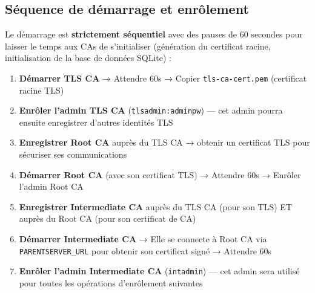 \documentclass[12pt,a4paper,twoside]{report}
\begin{document}
\subsection{Séquence de démarrage et enrôlement}

Le démarrage est \textbf{strictement séquentiel} avec des pauses de 60 secondes pour laisser le temps aux CAs de s'initialiser (génération du certificat racine, initialisation de la base de données SQLite) :

\begin{enumerate}
    \item \textbf{Démarrer TLS CA} → Attendre 60s → Copier \texttt{tls-ca-cert.pem} (certificat racine TLS)
    \item \textbf{Enrôler l'admin TLS CA} (\texttt{tlsadmin:adminpw}) --- cet admin pourra ensuite enregistrer d'autres identités TLS
    \item \textbf{Enregistrer Root CA} auprès du TLS CA → obtenir un certificat TLS pour sécuriser ses communications
    \item \textbf{Démarrer Root CA} (avec son certificat TLS) → Attendre 60s → Enrôler l'admin Root CA
    \item \textbf{Enregistrer Intermediate CA} auprès du TLS CA (pour son TLS) ET auprès du Root CA (pour son certificat de CA)
    \item \textbf{Démarrer Intermediate CA} → Elle se connecte à Root CA via \texttt{PARENTSERVER\_URL} pour obtenir son certificat signé → Attendre 60s
    \item \textbf{Enrôler l'admin Intermediate CA} (\texttt{intadmin}) --- cet admin sera utilisé pour toutes les opérations d'enrôlement suivantes
\end{enumerate}
\end{document}
